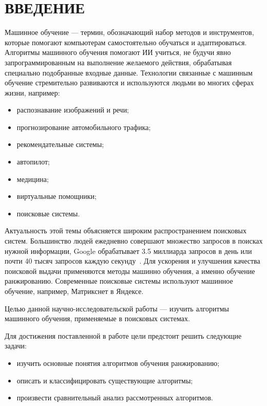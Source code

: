 \chapter*{ВВЕДЕНИЕ}

Машинное обучение --- термин, обозначающий набор методов и инструментов, которые помогают компьютерам самостоятельно обучаться и адаптироваться. Алгоритмы машинного обучения помогают ИИ учиться, не будучи явно запрограммированным на выполнение желаемого действия, обрабатывая специально подобранные входные данные. Технологии связанные с машинным обучение стремительно развиваются и используются людьми во многих сферах жизни, например:

\begin{itemize}[label=---]
	\item распознавание изображений и речи;
	\item прогнозирование автомобильного трафика;
	\item рекомендательные системы;
	\item автопилот;
	\item медицина;
	\item виртуальные помощники;
	\item поисковые системы.
\end{itemize}

Актуальность этой темы объясняется широким распространением поисковых систем. Большинство людей ежедневно совершают множество запросов в поисках нужной информации, Google обрабатывает 3.5 миллиарда запросов в день или почти 40 тысяч запросов каждую секунду~\cite{google}. Для ускорения и улучшения качества поисковой выдачи применяются методы машинно обучения, а именно обучение ранжированию. Современные поисковые системы используют машинное обучение, например, Матрикснет в Яндексе.

Целью данной научно-исследовательской работы --- изучить алгоритмы машинного обучения, применяемые в поисковых системах. 

Для достижения поставленной в работе цели предстоит решить следующие задачи:
\begin{itemize}[label=---]
	\item изучить основные понятия алгоритмов обучения ранжированию;
	\item описать и классифицировать существующие алгоритмы;
	\item произвести сравнительный анализ рассмотренных алгоритмов.
\end{itemize}


